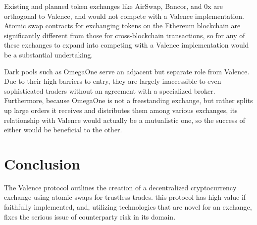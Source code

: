 \documentclass[a4paper]{article}
\begin{document}
    Existing and planned token exchanges like AirSwap, Bancor, and 0x are orthogonal to Valence, and would not compete with a Valence implementation. Atomic swap contracts for exchanging tokens on the Ethereum blockchain are significantly different from those for cross-blockchain transactions, so for any of these exchanges to expand into competing with a Valence implementation would be a substantial undertaking.

    Dark pools such as OmegaOne serve an adjacent but separate role from Valence. Due to their high barriers to entry, they are largely inaccessible to even sophisticated traders without an agreement with a specialized broker. Furthermore, because OmegaOne is not a freestanding exchange, but rather splits up large orders it receives and distributes them among various exchanges, its relationship with Valence would actually be a mutualistic one, so the success of either would be beneficial to the other.

\section*{Conclusion}
	The Valence protocol outlines the creation of a
    decentralized
    cryptocurrency exchange using atomic swaps for trustless trades.
    this protocol has high value if
    faithfully implemented, and, utilizing technologies that are
    novel for an exchange, fixes the serious issue of
    counterparty risk in its domain.
\end{document}

